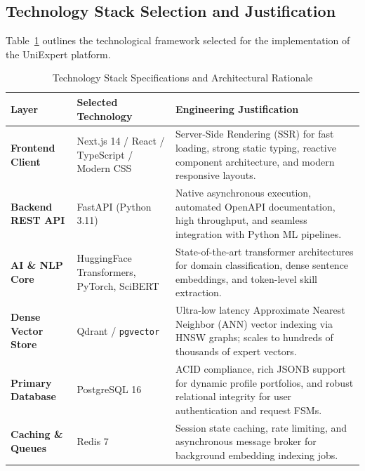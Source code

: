 \documentclass[11pt,a4paper]{article}
\begin{document}
\subsection{Technology Stack Selection and Justification}
Table~\ref{tab:tech_stack} outlines the technological framework selected for the implementation of the UniExpert platform.

\begin{table}[htbp]
\centering
\small
\caption{Technology Stack Specifications and Architectural Rationale}
\label{tab:tech_stack}
\begin{tabularx}{\textwidth}{@{}l p{3.2cm} X@{}}
\toprule
\textbf{Layer} & \textbf{Selected Technology} & \textbf{Engineering Justification} \\
\midrule
\textbf{Frontend Client} & Next.js 14 / React / TypeScript / Modern CSS & Server-Side Rendering (SSR) for fast loading, strong static typing, reactive component architecture, and modern responsive layouts. \\
\addlinespace
\textbf{Backend REST API} & FastAPI (Python 3.11) & Native asynchronous execution, automated OpenAPI documentation, high throughput, and seamless integration with Python ML pipelines. \\
\addlinespace
\textbf{AI \& NLP Core} & HuggingFace Transformers, PyTorch, SciBERT & State-of-the-art transformer architectures for domain classification, dense sentence embeddings, and token-level skill extraction. \\
\addlinespace
\textbf{Dense Vector Store} & Qdrant / \texttt{pgvector} & Ultra-low latency Approximate Nearest Neighbor (ANN) vector indexing via HNSW graphs; scales to hundreds of thousands of expert vectors. \\
\addlinespace
\textbf{Primary Database} & PostgreSQL 16 & ACID compliance, rich JSONB support for dynamic profile portfolios, and robust relational integrity for user authentication and request FSMs. \\
\addlinespace
\textbf{Caching \& Queues} & Redis 7 & Session state caching, rate limiting, and asynchronous message broker for background embedding indexing jobs. \\
\bottomrule
\end{tabularx}
\end{table}

\end{document}
